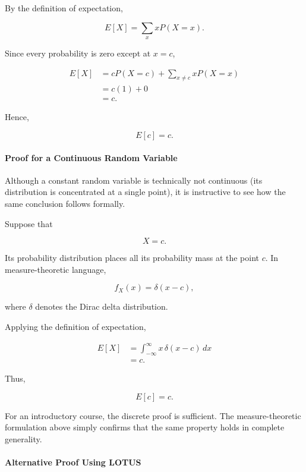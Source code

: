 \documentclass[11pt]{article}
\begin{document}
\begin{mdframed}[
		linewidth=0.8pt,
		roundcorner=6pt,
		backgroundcolor=gray!5,
		linecolor=gray!60,
		innertopmargin=10pt,
		innerbottommargin=10pt,
		innerleftmargin=10pt,
		innerrightmargin=10pt
		]
		By the definition of expectation,
		
		\[
		E[X]
		=
		\sum_x
		xP(X=x).
		\]
		
		Since every probability is zero except at \(x=c\),
		
		\[
		\begin{aligned}
			E[X]
			&=
			cP(X=c)
			+
			\sum_{x\neq c}
			xP(X=x)
			\\[0.3cm]
			&=
			c(1)
			+
			0
			\\[0.3cm]
			&=
			c.
		\end{aligned}
		\]
		
		Hence,
		
		\[
		\boxed{
			E[c]=c.
		}
		\]
		
		\bigskip
		
		\paragraph{Proof for a Continuous Random Variable}
		
		Although a constant random variable is technically not continuous (its
		distribution is concentrated at a single point), it is instructive to see
		how the same conclusion follows formally.
		
		Suppose that
		
		\[
		X=c.
		\]
		
		Its probability distribution places all its probability mass at the point
		\(c\). In measure-theoretic language,
		
		\[
		f_X(x)
		=
		\delta(x-c),
		\]
		
		where \(\delta\) denotes the Dirac delta distribution.
		
		Applying the definition of expectation,
		
		\[
		\begin{aligned}
			E[X]
			&=
			\int_{-\infty}^{\infty}
			x\,\delta(x-c)\,dx
			\\[0.3cm]
			&=
			c.
		\end{aligned}
		\]
		
		Thus,
		
		\[
		\boxed{
			E[c]=c.
		}
		\]
		
		\medskip
		
		For an introductory course, the discrete proof is sufficient. The
		measure-theoretic formulation above simply confirms that the same property
		holds in complete generality.
		
		\bigskip
		
		\paragraph{Alternative Proof Using LOTUS}
		

\end{mdframed}
\end{document}
